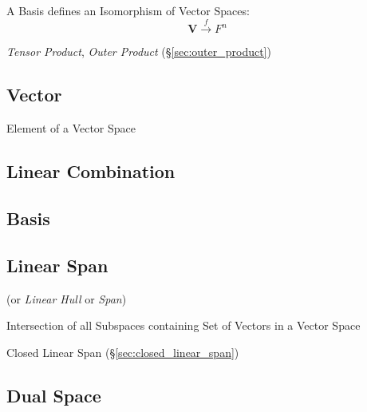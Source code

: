 A Basis defines an Isomorphism of Vector Spaces:
\[
    \mathbf{V} \xrightarrow{f} F^n
\]

\emph{Tensor Product}, \emph{Outer Product} (\S\ref{sec:outer_product})



\subsection{Vector}\label{sec:vector}

Element of a Vector Space



\subsection{Linear Combination}\label{sec:linear_combination}

\subsection{Basis}\label{sec:basis}

\subsection{Linear Span}\label{sec:linear_span}

(or \emph{Linear Hull} or \emph{Span})

Intersection of all Subspaces containing Set of Vectors in a Vector
Space

Closed Linear Span (\S\ref{sec:closed_linear_span})



\subsection{Dual Space}\label{sec:dual_space}

